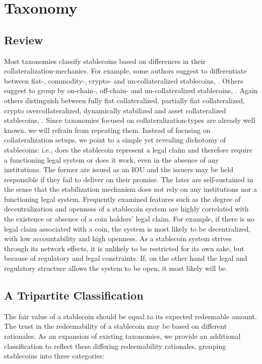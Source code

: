 \documentclass[conference]{IEEEtran}
\begin{document}
\section{Taxonomy}
\label{sec:taxonomy}
\subsection{Review}
Most taxonomies classify stablecoins based on differences in their collateralization-mechanics. For example, some authors suggest to differentiate between fiat-, commodity-, crypto- and un-collateralized stablecoins, \cite{Hays}. Others suggest to group by on-chain-, off-chain- and un-collateralized stablecoins, \cite{Berentsen2}. Again others distinguish between fully fiat collateralized, partially fiat collateralized, crypto overcollateralized, dynamically stabilized and asset collateralized stablecoins, \cite{Lipton2}. Since taxonomies focused on collateralization-types are already well known, we will refrain from repeating them. Instead of focusing on collateralization setups, we point to a simple yet revealing dichotomy of stablecoins: i.e., does the stablecoin represent a legal claim and therefore require a functioning legal system or does it work, even in the absence of any institutions. The former are issued as an IOU and the issuers may be held responsible if they fail to deliver on their promise. The later are self-sustained in the sense that the stabilization mechanism does not rely on any institutions nor a functioning legal system. Frequently examined features such as the degree of decentralization and openness of a stablecoin system are highly correlated with the existence or absence of a coin holders' legal claim. For example, if there is no legal claim associated with a coin, the system is most likely to be decentralized, with low accountability and high openness. As a stablecoin system strives through its network effects, it is unlikely to be restricted for its own sake, but because of regulatory and legal constraints. If, on the other hand the legal and regulatory structure allows the system to be open, it most likely will be.

\subsection{A Tripartite Classification}
The fair value of a stablecoin should be equal to its expected redeemable amount. The trust in the redeemability of a stablecoin may be based on different rationales. As an expansion of existing taxonomies, we provide an additional classification to reflect these differing redeemability rationales, grouping stablecoins into three categories:
\end{document}
